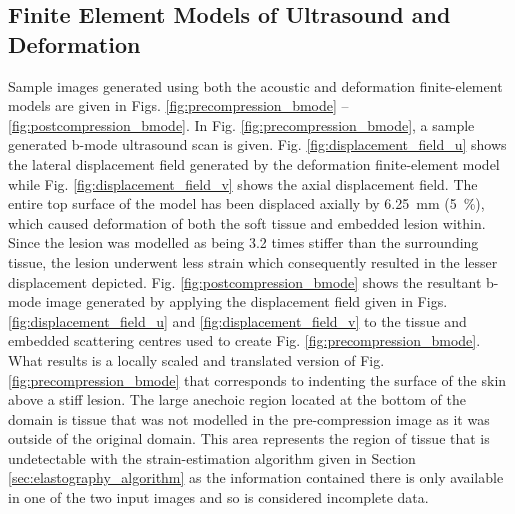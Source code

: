 		\subsection{Finite Element Models of Ultrasound and Deformation}
			\label{sec:femresults}
			Sample images generated using both the acoustic and deformation finite-element models are given in Figs. \ref{fig:precompression_bmode} -- \ref{fig:postcompression_bmode}. In Fig. \ref{fig:precompression_bmode}, a sample generated b-mode ultrasound scan is given. Fig. \ref{fig:displacement_field_u} shows the lateral displacement field generated by the deformation finite-element model while Fig. \ref{fig:displacement_field_v} shows the axial displacement field. The entire top surface of the model has been displaced axially by \SI{6.25}{\mm} (\SI{5}{\percent}), which caused deformation of both the soft tissue and embedded lesion within. Since the lesion was modelled as being 3.2 times stiffer than the surrounding tissue, the lesion underwent less strain which consequently resulted in the lesser displacement depicted. Fig. \ref{fig:postcompression_bmode} shows the resultant b-mode image generated by applying the displacement field given in Figs. \ref{fig:displacement_field_u} and \ref{fig:displacement_field_v} to the tissue and embedded scattering centres used to create Fig. \ref{fig:precompression_bmode}. What results is a locally scaled and translated version of Fig. \ref{fig:precompression_bmode} that corresponds to indenting the surface of the skin above a stiff lesion. The large anechoic region located at the bottom of the domain is tissue that was not modelled in the pre-compression image as it was outside of the original domain. This area represents the region of tissue that is undetectable with the strain-estimation algorithm given in Section \ref{sec:elastography_algorithm} as the information contained there is only available in one of the two input images and so is considered incomplete data.

